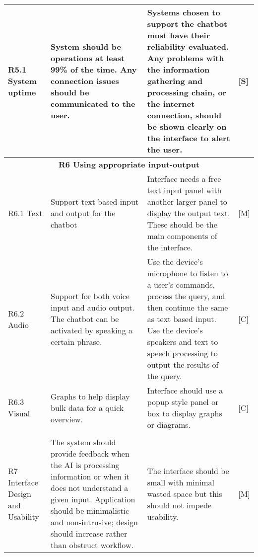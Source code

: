 \documentclass{IEEEtran}
\begin{document}
\begin{center}
\begin{longtable}{ | m{3cm} | m{7cm} | m{7cm} | m{0.5cm} | }
		\hline	
		
		R5.1 System uptime & 
		System should be operations at least 99\% of the time.	Any connection issues should be communicated to the user. &
		Systems chosen to support the chatbot must have their reliability evaluated. Any problems with the information gathering and processing chain, or the internet connection, should be shown clearly on the interface to alert the user. &
		[S] \\
		
		\hline
		
		\multicolumn{4}{|c|}{\textbf{R6 Using appropriate input-output}} \\

		\hline
		
		R6.1 Text & 
		Support text based input and output for the chatbot & 
		Interface needs a free text input panel with another larger panel to display the output text. These should be the main components of the interface. & 
		[M] \\
		
		\hline
		
		R6.2 Audio & 
		Support for both voice input and audio output. The chatbot can be activated by speaking a certain phrase. & 
		Use the device’s microphone to listen to a user's commands, process the query, and then continue the same as text based input. Use the device’s speakers and text to speech processing to output the results of the query. & 
		[C] \\
		
		\hline
		
		R6.3 Visual & 
		Graphs to help display bulk data for a quick overview. & 
		Interface should use a popup style panel or box to display graphs or diagrams. &
		[C] \\
		
		\hline
		
		\multicolumn{4}{|c|}{} \\
		
		\hline
		
		R7 Interface Design and Usability & 
		The system should provide feedback when the AI is processing information or when it does not understand a given input. Application should be minimalistic and non-intrusive; design should increase rather than obstruct workflow. & 
		The interface should be small with minimal wasted space but this should not impede usability. & 
		[M] \\
		
		\hline
		

\end{longtable}
\end{center}
\end{document}

